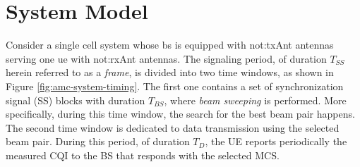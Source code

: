 %
%

\section{System Model}
\label{sec:amc-system-model}

Consider a single cell system whose \gls{bs} is equipped with \gls{not:txAnt} antennas serving one \gls{ue} with \gls{not:rxAnt} antennas. The signaling period, of duration $T_{SS}$ herein referred to as a \emph{frame}, is divided into two time windows, as shown in Figure \ref{fig:amc-system-timing}. The first one contains a set of synchronization signal (SS) blocks with duration $T_{BS}$, where \emph{beam sweeping} is performed. More specifically, during this time window, the search for the best beam pair happens. The second time window is dedicated to data transmission using the selected beam pair. During this period, of duration $T_{D}$, the UE reports periodically the measured CQI to the BS that responds with the selected MCS.
%
%

